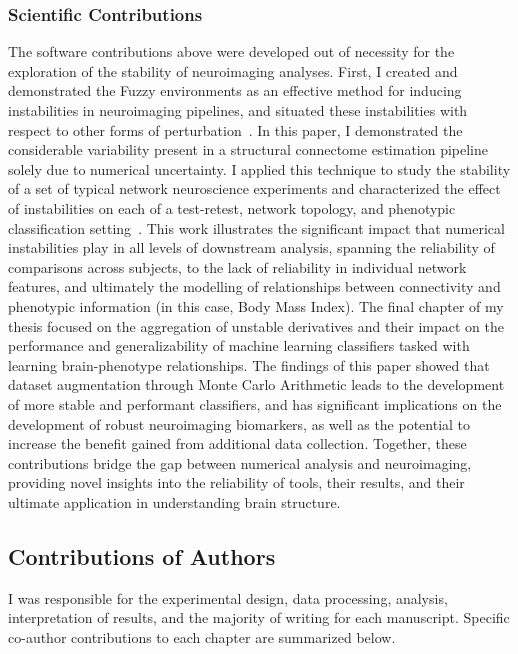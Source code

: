 \subsubsection*{Scientific Contributions}
The software contributions above were developed out of necessity for the exploration of the stability of neuroimaging
analyses. First, I created and demonstrated the Fuzzy environments as an effective method for inducing instabilities in
neuroimaging pipelines, and situated these instabilities with respect to other forms of
perturbation~\cite{Kiar2020-lb}. In this paper, I demonstrated the considerable variability present in a structural
connectome estimation pipeline solely due to numerical uncertainty. I applied this technique to study the stability of
a set of typical network neuroscience experiments and characterized the effect of instabilities on each of a
test-retest, network topology, and phenotypic classification setting~\cite{Kiar2020-kz}. This work illustrates the
significant impact that numerical instabilities play in all levels of downstream analysis, spanning the reliability of
comparisons across subjects, to the lack of reliability in individual network features, and ultimately the modelling of
relationships between connectivity and phenotypic information (in this case, Body Mass Index). The final chapter of my
thesis focused on the aggregation of unstable derivatives and their impact on the performance and generalizability of
machine learning classifiers tasked with learning brain-phenotype relationships. The findings of this paper showed that
dataset augmentation through Monte Carlo Arithmetic leads to the development of more stable and performant classifiers,
and has significant implications on the development of robust neuroimaging biomarkers, as well as the potential to
increase the benefit gained from additional data collection. Together, these contributions bridge the gap between
numerical analysis and neuroimaging, providing novel insights into the reliability of tools, their results, and their
ultimate application in understanding brain structure.

\subsection{Contributions of Authors}
I was responsible for the experimental design, data processing, analysis, interpretation of results, and the majority
of writing for each manuscript. Specific co-author contributions to each chapter are summarized below.

